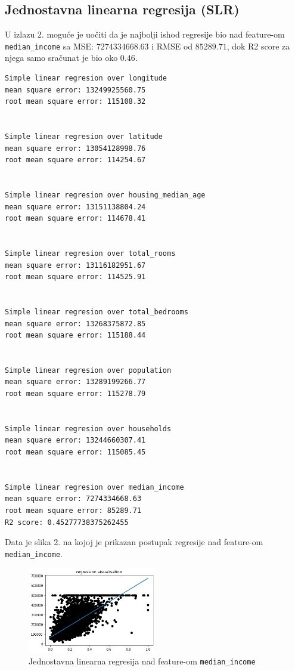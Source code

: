 \documentclass[fontsize=12bp, paper=a4]{scrarticle}
\begin{document}
\subsection{Jednostavna linearna regresija (SLR)}
U izlazu 2. moguće je uočiti da je najbolji ishod regresije bio nad feature-om \verb|median_income| sa MSE: $7274334668.63$ i RMSE od $85289.71$, dok R2 score za njega samo sračunat je bio oko $0.46$.
\begin{lstlisting}[caption=\centering SLR za sve features-e ponaosob]
Simple linear regresion over longitude
mean square error: 13249925560.75
root mean square error: 115108.32


Simple linear regresion over latitude
mean square error: 13054128998.76
root mean square error: 114254.67


Simple linear regresion over housing_median_age
mean square error: 13151138804.24
root mean square error: 114678.41


Simple linear regresion over total_rooms
mean square error: 13116182951.67
root mean square error: 114525.91


Simple linear regresion over total_bedrooms
mean square error: 13268375872.85
root mean square error: 115188.44


Simple linear regresion over population
mean square error: 13289199266.77
root mean square error: 115278.79


Simple linear regresion over households
mean square error: 13244660307.41
root mean square error: 115085.45


Simple linear regresion over median_income
mean square error: 7274334668.63
root mean square error: 85289.71
R2 score: 0.45277738375262455
\end{lstlisting}

Data je slika 2. na kojoj je prikazan postupak regresije nad feature-om \verb|median_income|.


\begin{figure}[h!]
    \centering
    \includegraphics[width=0.5\textwidth]{2.png}
    \caption{\centering Jednostavna linearna regresija nad feature-om \texttt{median\_income}}
\end{figure}      
\end{document}
